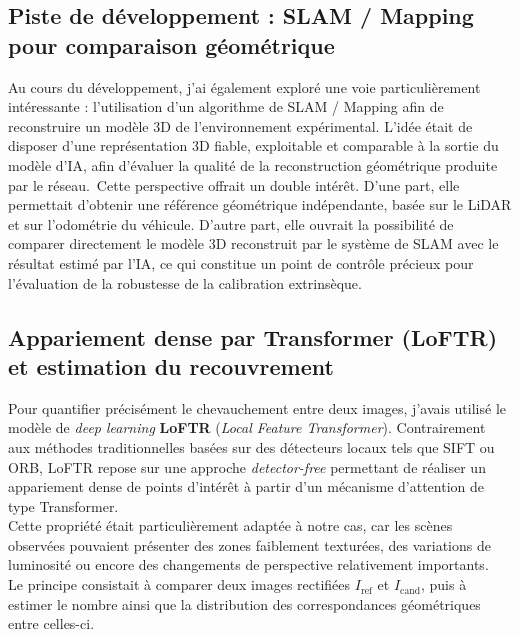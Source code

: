 \documentclass[12pt,a4paper,oneside]{report}
\begin{document}
\subsection{Piste de développement : SLAM / Mapping pour comparaison géométrique}

\hspace*{.3cm}Au cours du développement, j'ai également exploré une voie particulièrement intéressante : l'utilisation d'un algorithme de SLAM / Mapping afin de reconstruire un modèle 3D de l'environnement expérimental. L'idée était de disposer d'une représentation 3D fiable, exploitable et comparable à la sortie du modèle d'IA, afin d'évaluer la qualité de la reconstruction géométrique produite par le réseau.\
\hspace*{0.3cm}Cette perspective offrait un double intérêt. D'une part, elle permettait d'obtenir une référence géométrique indépendante, basée sur le LiDAR et sur l'odométrie du véhicule. D'autre part, elle ouvrait la possibilité de comparer directement le modèle 3D reconstruit par le système de SLAM avec le résultat estimé par l'IA, ce qui constitue un point de contrôle précieux pour l'évaluation de la robustesse de la calibration extrinsèque.\

\hspace*{0.3cm}
\subsection{Appariement dense par Transformer (LoFTR) et estimation du recouvrement}

\hspace*{.3cm}Pour quantifier précisément le chevauchement entre deux images, j'avais utilisé le modèle de \textit{deep learning} \textbf{LoFTR} (\textit{Local Feature Transformer}). Contrairement aux méthodes traditionnelles basées sur des détecteurs locaux tels que SIFT ou ORB, LoFTR repose sur une approche \textit{detector-free} permettant de réaliser un appariement dense de points d'intérêt à partir d'un mécanisme d'attention de type Transformer.\\
\hspace*{.3cm}Cette propriété était particulièrement adaptée à notre cas, car les scènes observées pouvaient présenter des zones faiblement texturées, des variations de luminosité ou encore des changements de perspective relativement importants.\\

\hspace*{.3cm}Le principe consistait à comparer deux images rectifiées $I_{\text{ref}}$ et $I_{\text{cand}}$, puis à estimer le nombre ainsi que la distribution des correspondances géométriques entre celles-ci.\\
\end{document}
